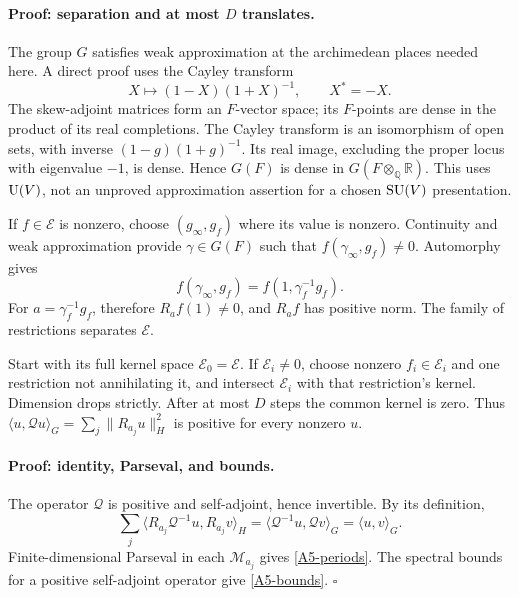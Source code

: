 \documentclass[11pt]{article}
\newcommand{\Q}{\mathbb Q}\newcommand{\C}{\mathbb C}\newcommand{\Z}{\mathbb Z}\newcommand{\R}{\mathbb R}\newcommand{\A}{\mathbb A}\newcommand{\OO}{\mathcal O}
\theoremstyle{definition}\newtheorem{definition}[theorem]{Definition}\newtheorem{remark}[theorem]{Remark}
\begin{document}
\paragraph{Proof: separation and at most $D$ translates.}
The group $G$ satisfies weak approximation at the archimedean places
needed here. A direct proof uses the Cayley transform
\[
 X\longmapsto(1-X)(1+X)^{-1},\qquad X^*=-X.
\]
The skew-adjoint matrices form an $F$-vector space; its $F$-points
are dense in the product of its real completions. The Cayley transform
is an isomorphism of open sets, with inverse
$(1-g)(1+g)^{-1}$. Its real image, excluding the proper locus with
eigenvalue $-1$, is dense. Hence $G(F)$ is dense in
$G(F\otimes_\Q\R)$. This uses $\operatorname{U}(V)$, not an unproved
approximation assertion for a chosen $\operatorname{SU}(V)$ presentation.

If $f\in\mathcal E$ is nonzero, choose $(g_\infty,g_f)$ where its
value is nonzero. Continuity and weak approximation provide
$\gamma\in G(F)$ such that $f(\gamma_\infty,g_f)\ne0$.
Automorphy gives
\[
 f(\gamma_\infty,g_f)=f(1,\gamma_f^{-1}g_f).
\]
For $a=\gamma_f^{-1}g_f$, therefore $R_af(1)\ne0$, and
$R_af$ has positive norm. The family of restrictions separates
$\mathcal E$.

Start with its full kernel space $\mathcal E_0=\mathcal E$.
If $\mathcal E_i\ne0$, choose nonzero $f_i\in\mathcal E_i$ and
one restriction not annihilating it, and intersect $\mathcal E_i$
with that restriction's kernel. Dimension drops strictly. After at
most $D$ steps the common kernel is zero. Thus
$\langle u,\mathcal Q u\rangle_G=\sum_j\|R_{a_j}u\|_H^2$
is positive for every nonzero $u$.

\paragraph{Proof: identity, Parseval, and bounds.}
The operator $\mathcal Q$ is positive and self-adjoint, hence
invertible. By its definition,
\[
 \sum_j\langle R_{a_j}\mathcal Q^{-1}u,R_{a_j}v\rangle_H
 =\langle\mathcal Q^{-1}u,\mathcal Q v\rangle_G
 =\langle u,v\rangle_G.
\]
Finite-dimensional Parseval in each $\mathcal M_{a_j}$ gives
\eqref{A5-periods}. The spectral bounds for a positive self-adjoint
operator give \eqref{A5-bounds}. $\square$
\end{document}
